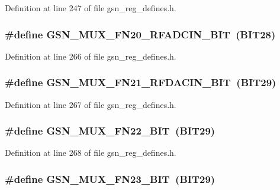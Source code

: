 Definition at line 247 of file gsn\_\-reg\_\-defines.h.

\hypertarget{a00546_a2b9c0a55b7508a30e3f610bfc5fc1721}{
\subsubsection[{GSN\_\-MUX\_\-FN20\_\-RFADCIN\_\-BIT}]{\setlength{\rightskip}{0pt plus 5cm}\#define GSN\_\-MUX\_\-FN20\_\-RFADCIN\_\-BIT~(BIT28)}}
\label{a00546_a2b9c0a55b7508a30e3f610bfc5fc1721}


Definition at line 266 of file gsn\_\-reg\_\-defines.h.

\hypertarget{a00546_a7d2bd2e76493f7c296ad08d8540e06d1}{
\subsubsection[{GSN\_\-MUX\_\-FN21\_\-RFDACIN\_\-BIT}]{\setlength{\rightskip}{0pt plus 5cm}\#define GSN\_\-MUX\_\-FN21\_\-RFDACIN\_\-BIT~(BIT29)}}
\label{a00546_a7d2bd2e76493f7c296ad08d8540e06d1}


Definition at line 267 of file gsn\_\-reg\_\-defines.h.

\hypertarget{a00546_a9650fe368133c0fc9d6fae953bf37106}{
\subsubsection[{GSN\_\-MUX\_\-FN22\_\-BIT}]{\setlength{\rightskip}{0pt plus 5cm}\#define GSN\_\-MUX\_\-FN22\_\-BIT~(BIT29)}}
\label{a00546_a9650fe368133c0fc9d6fae953bf37106}


Definition at line 268 of file gsn\_\-reg\_\-defines.h.

\hypertarget{a00546_a88e9d2cb50c9d1779d5020cf87f7e422}{
\subsubsection[{GSN\_\-MUX\_\-FN23\_\-BIT}]{\setlength{\rightskip}{0pt plus 5cm}\#define GSN\_\-MUX\_\-FN23\_\-BIT~(BIT29)}}
\label{a00546_a88e9d2cb50c9d1779d5020cf87f7e422}


